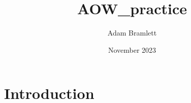 \documentclass{article}
\title{AOW_practice}
\author{Adam Bramlett}
\date{November 2023}
\begin{document}
\maketitle


\section{Introduction}


\end{document}
